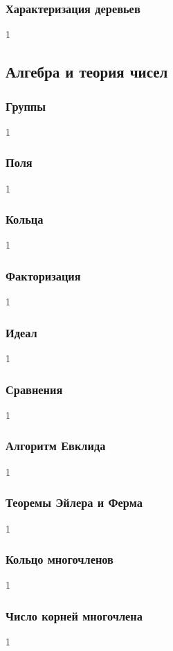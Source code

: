 \documentclass[14pt]{matmex-diploma}
\begin{document}
        \subsubsection*{Характеризация деревьев}      
            1
        
    \subsection{Алгебра и теория чисел}
        
        \subsubsection*{Группы}
            1
        \subsubsection*{Поля}
            1
        \subsubsection*{Кольца}
            1
        \subsubsection*{Факторизация}
            1
        \subsubsection*{Идеал}
            1
        \subsubsection*{Сравнения}
            1
        \subsubsection*{Алгоритм Евклида}
            1
        \subsubsection*{Теоремы Эйлера и Ферма}
            1
        \subsubsection*{Кольцо многочленов}
            1
        \subsubsection*{Число корней многочлена}
            1
\end{document}
